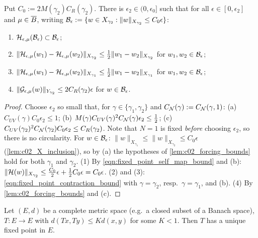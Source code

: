 \begin{lemma}
  \label{lem:c02_H_contraction}
  Put $C_0:=2M(\gamma_2)C_R(\gamma_2)$. There is $\epsilon_2\in(0,\epsilon_0]$ such that for all $\epsilon\in[0,\epsilon_2]$ and $\mu\in\overline{B}$,
  writing $\mathcal{B}_\epsilon:=\{w\in X_{\gamma_2}:\|w\|_{X_{\gamma_2}}\le C_0\epsilon\}$:
  \begin{enumerate}
    \item $\mathcal{H}_{\epsilon,\mu}(\mathcal{B}_\epsilon)\subset\mathcal{B}_\epsilon$;
    \item $\|\mathcal{H}_{\epsilon,\mu}(w_1)-\mathcal{H}_{\epsilon,\mu}(w_2)\|_{X_{\gamma_2}}\le\frac12\|w_1-w_2\|_{X_{\gamma_2}}$ for $w_1,w_2\in\mathcal{B}_\epsilon$;
    \item $\|\mathcal{H}_{\epsilon,\mu}(w_1)-\mathcal{H}_{\epsilon,\mu}(w_2)\|_{X_{\gamma_1}}\le\frac12\|w_1-w_2\|_{X_{\gamma_1}}$ for $w_1,w_2\in\mathcal{B}_\epsilon$;
    \item $\|\mathcal{G}_{\epsilon,\mu}(w)\|_{Y_{\gamma_2}}\le 2C_R(\gamma_2)\epsilon$ for $w\in\mathcal{B}_\epsilon$.
  \end{enumerate}
\end{lemma}
\begin{proof}
  Choose $\epsilon_2$ so small that, for $\gamma\in\{\gamma_1,\gamma_2\}$ and $C_{\mathcal{N}}(\gamma):=C_{\mathcal{N}}(\gamma,1)$:
  (a) $C_{UV}(\gamma)C_0\epsilon_2\le1$; (b) $M(\gamma)C_{UV}(\gamma)^2C_{\mathcal{N}}(\gamma)\epsilon_2\le\frac12$;
  (c) $C_{UV}(\gamma_2)^2C_{\mathcal{N}}(\gamma_2)C_0\epsilon_2\le C_R(\gamma_2)$.
  Note that $N=1$ is fixed \emph{before} choosing $\epsilon_2$, so there is no circularity.
  For $w\in\mathcal{B}_\epsilon$: $\|w\|_{X_{\gamma_1}}\le\|w\|_{X_{\gamma_2}}\le C_0\epsilon$ (\cref{lem:c02_X_inclusion}), so by (a) the hypotheses of
  \cref{lem:c02_forcing_bounds} hold for both $\gamma_1$ and $\gamma_2$.
  (1) By \eqref{eqn:fixed_point_self_map_bound} and (b): $\|\mathcal{H}(w)\|_{X_{\gamma_2}}\le\frac{C_0}2\epsilon+\frac12C_0\epsilon=C_0\epsilon$.
  (2) and (3): \eqref{eqn:fixed_point_contraction_bound} with $\gamma=\gamma_2$, resp.\ $\gamma=\gamma_1$, and (b).
  (4) By \cref{lem:c02_forcing_bounds} and (c).
\end{proof}

\begin{lemma}
  \label{lem:c02_banach_fixed_point}
  \mathlibok
  Let $(E,d)$ be a complete metric space (e.g.\ a closed subset of a Banach space), $T:E\to E$ with
  $d(Tx,Ty)\le K d(x,y)$ for some $K<1$. Then $T$ has a unique fixed point in $E$.
\end{lemma}

